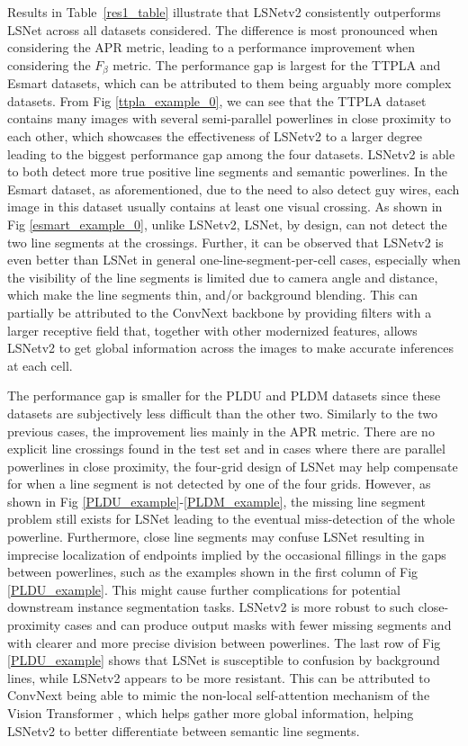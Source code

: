 \documentclass[journal]{IEEEtran}
\begin{document}
 Results in Table~\ref{res1_table} illustrate that LSNetv2 consistently outperforms LSNet across all datasets considered. The difference is most pronounced when considering the APR metric, leading to a performance improvement when considering the $F_{\beta}$ metric. The performance gap is largest for the TTPLA and Esmart datasets, which can be attributed to them being arguably more complex datasets.  From Fig \ref{ttpla_example_0}, we can see that the TTPLA dataset contains many images with several semi-parallel powerlines in close proximity to each other, which showcases the effectiveness of LSNetv2 to a larger degree leading to the biggest performance gap among the four datasets. LSNetv2 is able to both detect more true positive line segments and semantic powerlines. In the Esmart dataset, as aforementioned, due to the need to also detect guy wires, each image in this dataset usually contains at least one visual crossing. As shown in Fig \ref{esmart_example_0}, unlike LSNetv2, LSNet, by design, can not detect the two line segments at the crossings. Further, it can be observed that LSNetv2 is even better than LSNet in general one-line-segment-per-cell cases, especially when the visibility of the line segments is limited due to camera angle and distance, which make the line segments thin, and/or background blending. This can partially be attributed to the ConvNext backbone by providing filters with a larger receptive field that, together with other modernized features, allows LSNetv2 to get global information across the images to make accurate inferences at each cell.
 
 The performance gap is smaller for the PLDU and PLDM datasets since these datasets are subjectively less difficult than the other two. Similarly to the two previous cases, the improvement lies mainly in the APR metric. There are no explicit line crossings found in the test set and in cases where there are parallel powerlines in close proximity, the four-grid design of LSNet may help compensate for when a line segment is not detected by one of the four grids. However, as shown in Fig \ref{PLDU_example}-\ref{PLDM_example}, the missing line segment problem still exists for LSNet leading to the eventual miss-detection of the whole powerline. Furthermore, close line segments may confuse LSNet resulting in imprecise localization of endpoints implied by the occasional fillings in the gaps between powerlines, such as the examples shown in the first column of Fig \ref{PLDU_example}. This might cause further complications for potential downstream instance segmentation tasks. LSNetv2 is more robust to such close-proximity cases and can produce output masks with fewer missing segments and with clearer and more precise division between powerlines. The last row of Fig \ref{PLDU_example} shows that LSNet is susceptible to confusion by background lines, while LSNetv2 appears to be more resistant. This can be attributed to ConvNext being able to mimic the non-local self-attention mechanism of the Vision Transformer \cite{vit}, which helps gather more global information, helping LSNetv2 to better differentiate between semantic line segments.
\end{document}
